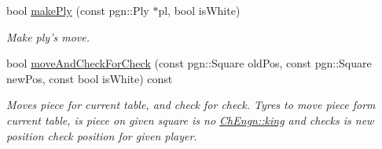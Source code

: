 \begin{DoxyCompactItemize}
bool \hyperlink{classChEngn_1_1Engine_a66f202e6cd42b2eeff43c8d58fe9ce38}{makePly} (const pgn::Ply $\ast$pl, bool isWhite)
\begin{DoxyCompactList}\small\item\em Make ply's move. \item\end{DoxyCompactList}\item 
bool \hyperlink{classChEngn_1_1Engine_a743f59a5351f46d39888ca50b7329920}{moveAndCheckForCheck} (const pgn::Square oldPos, const pgn::Square newPos, const bool isWhite) const 
\begin{DoxyCompactList}\small\item\em Moves piece for current table, and check for check. Tyres to move piece form current table, is piece on given square is no \hyperlink{namespaceChEngn_a40c2dbaf0963b46704f08ffb28364cea}{ChEngn::king} and checks is new position check position for given player. \item\end{DoxyCompactList}\end{DoxyCompactItemize}
